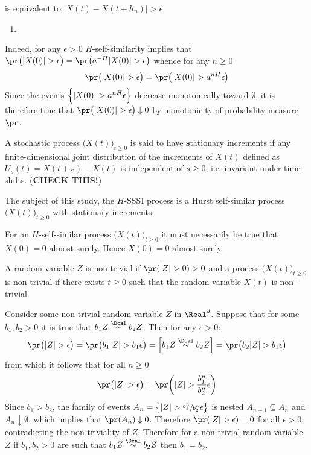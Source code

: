 is equivalent to $\lvert X(t) - X(t+h_n) \rvert > \epsilon$
\begin{enumerate}
	\item 
\end{enumerate}

Indeed, for any $\epsilon>0$ $H$-self-similarity
implies that $\pr\bigl( |X(0)|>\epsilon \bigr) = \pr\bigl( a^{-H} |X(0)|>\epsilon \bigr)$
whence for any $n\geq 0$
\[
\pr\bigl( |X(0)|>\epsilon \bigr) = \pr\bigl( |X(0)| > a^{nH} \epsilon \bigr)
\]
Since the events $\Bigl\{|X(0)| > a^{nH} \epsilon\Bigr\}$ decrease monotonically
toward $\emptyset$, it is therefore true that $\pr\bigl( |X(0)|>\epsilon \bigr) \downarrow 0$
by monotonicity of probability measure $\pr$.


A stochastic process $\bigl(X(t)\bigr)_{t\geq0}$ is said to have \textbf{s}tationary
\textbf{i}ncrements if any finite-dimensional joint distribution of the increments of
$X(t)$ defined as $U_s(t) = X(t+s)-X(t)$ is independent of $s\geq0$, i.e. invariant
under time shifts. (\textbf{CHECK THIS!})

The subject of this study, the $H$-SSSI process is a Hurst self-similar process
$\bigl(X(t)\bigr)_{t\geq0}$ with stationary increments.



For an $H$-self-similar process $\bigl(X(t)\bigr)_{t\geq 0}$ it must necessarily
be true that $X(0) = 0$ almost surely. Hence $X(0) = 0$ almost surely.


A random variable $Z$ is non-trivial if $\pr(|Z| > 0 ) > 0$ and a process $\bigl(X(t)\bigr)_{t\geq0}$
is non-trivial if there exists $t\geq 0$ such that the random variable $X(t)$ is non-trivial.

Consider some non-trivial random variable $Z$ in $\Real^d$. Suppose that for some
$b_1,b_2>0$ it is true that $b_1 Z\overset{\Dcal}{\sim} b_2 Z$. Then for any $\epsilon>0$:
\[
\pr\bigl( |Z| > \epsilon \bigr)
= \pr\bigl( b_1 |Z| > b_1 \epsilon \bigr)
= \Bigl[ b_1 Z\overset{\Dcal}{\sim} b_2 Z \Bigr]
= \pr\bigl( b_2 |Z| > b_1 \epsilon \bigr)
\]
from which it follows that for all $n\geq 0$
\[
\pr\bigl( |Z| > \epsilon \bigr) = \pr\biggl( |Z| > \frac{b_1^n}{b_2^n} \epsilon \biggr)
\]
Since $b_1>b_2$, the family of events $A_n = \bigl\{ |Z| > \sfrac{b_1^n}{b_2^n} \epsilon \bigr\}$
is nested $A_{n+1}\subseteq A_n$ and $A_n \downarrow \emptyset$, which implies that
$\pr(A_n) \downarrow 0$. Therefore $\pr(|Z|> \epsilon) = 0$ for all $\epsilon>0$,
contradicting the non-triviality of $Z$. Therefore for a non-trivial random variable
$Z$ if $b_1,b_2>0$ are such that $b_1 Z\overset{\Dcal}{\sim} b_2 Z$ then $b_1 = b_2$.

